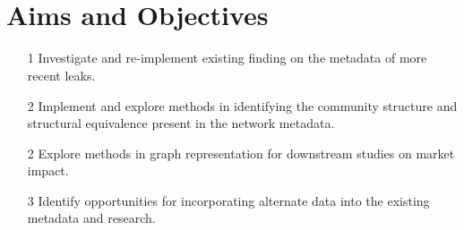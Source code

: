 \documentclass[a4paper,latin]{paper}
\begin{document}
\\
\\
 

\section{Aims and Objectives}  
\begin{itemize}
\item[1] Investigate and re-implement existing finding on the metadata of more recent leaks.  
\item[2] Implement and explore methods in identifying the community structure and structural equivalence present in the network metadata.  
\item[2] Explore methods in graph representation for downstream studies on market impact.  
\item[3] Identify opportunities for incorporating alternate data into the existing metadata and research.
\end{itemize}
\end{document}
